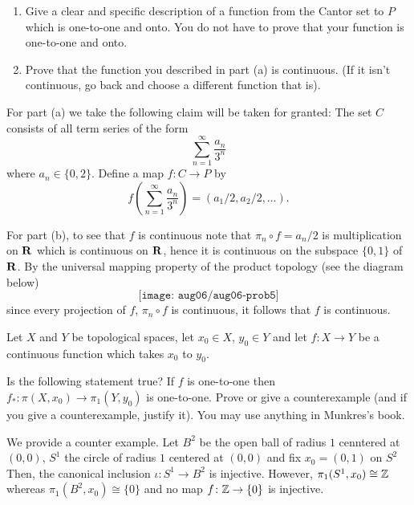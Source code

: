 \begin{problem}
  \hfill
  \begin{enumerate}[label=(\alph*),noitemsep]
  \item Give a clear and specific description of a function from the Cantor
    set to $P$ which is one-to-one and onto. You do not have to prove that
    your function is one-to-one and onto.
  \item Prove that the function you described in part (a) is
    continuous. (If it isn't continuous, go back and choose a different
    function that is).
  \end{enumerate}
\end{problem}
\begin{solution}
  For part (a) we take the following claim will be taken for granted: The
  set $C$ consists of all term series of the form
  \[
    \sum_{n=1}^\infty\frac{a_n}{3^n}
  \]
  where $a_n\in\{0,2\}$. Define a map $f\colon C\to P$ by
  \[
    f\left(\sum_{n=1}^\infty\frac{a_n}{3^n}\right)=(a_1/2,a_2/2,\ldots).
  \]

  For part (b), to see that $f$ is continuous note that
  $\pi_n\circ f=a_n/2$ is multiplication on $\mathbf{R}$ which is continuous on
  $\mathbf{R}$, hence it is continuous on the subspace $\{0,1\}$ of $\mathbf{R}$. By
  the universal mapping property of the product topology (see the diagram
  below)
  \[
    \texttt{[image: aug06/aug06-prob5]}
  \]
  since every projection of $f$, $\pi_n\circ f$ is continuous, it follows
  that $f$ is continuous.
\end{solution}

\begin{problem}
  Let $X$ and $Y$ be topological spaces, let $x_0\in X$, $y_0\in Y$ and let
  $f\colon X\to Y$ be a continuous function which takes $x_0$ to $y_0$.

  Is the following statement true? If $f$ is one-to-one then
  $f_*\colon\pi(X,x_0)\to \pi_1(Y,y_0)$ is one-to-one. Prove or give a
  counterexample (and if you give a counterexample, justify it). You may
  use anything in Munkres's book.
\end{problem}
\begin{solution}
  We provide a counter example. Let $B^2$ be the open ball of radius $1$
  cenntered at $(0,0)$, $S^1$ the circle of radius $1$ centered at $(0,0)$
  and fix $x_0=(0,1)$ on $S^2$ Then, the canonical inclusion
  $\iota\colon S^1\to B^2$ is injective. However, $\pi_1(S^1,x_0)\cong\mathbb{Z}$
  whereas $\pi_1(B^2,x_0)\cong \{0\}$ and no map $f\colon\mathbb{Z}\to\{0\}$ is
  injective.
\end{solution}

